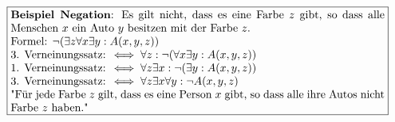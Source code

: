 \documentclass[../gruppenarbeit_1.tex]{subfiles}
\begin{document}
    \begin{align}
        \fbox{\begin{minipage}{11.8cm}
                  \textbf{Beispiel Negation}: Es gilt nicht, dass es eine Farbe $z$ gibt, so dass alle Menschen $x$ ein Auto $y$ besitzen mit der Farbe $z$.
                  \\Formel: $\neg(\exists z \forall x \exists y : A(x, y, z))$
                  \\3. Verneinungssatz: $\iff \forall z: \neg(\forall x \exists y : A(x, y, z))$
                  \\1. Verneinungssatz: $\iff \forall z \exists x : \neg(\exists y: A(x, y, z))$
                  \\3. Verneinungssatz: $\iff \forall z \exists x \forall y : \neg A(x, y, z)$
                  \\"Für jede Farbe $z$ gilt, dass es eine Person $x$ gibt, so dass alle ihre Autos nicht Farbe $z$ haben."
        \end{minipage}}
    \end{align}
\end{document}
